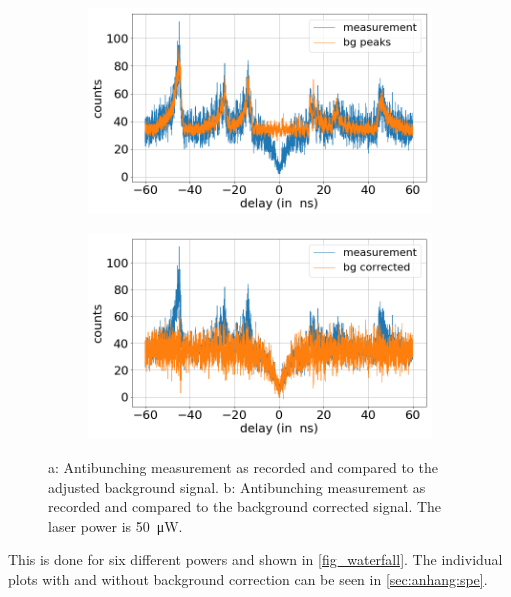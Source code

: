 \begin{figure}[H]
    \centering
    \begin{subfigure}{0.7\textwidth}
        \centering
        \includegraphics[width=1.0\textwidth]{img/output_t2/50.0muW_bg_peaks.png}
    \caption{}
    \label{fig_antibunch_background_comp}
    \end{subfigure}
    \begin{subfigure}{0.7\textwidth}
        \centering
        \includegraphics[width=\textwidth]{img/output_t2/50.0muW_bg_vgl.png}
        \caption{}
        \label{fig_antibunch_raw_corr_comp}
    \end{subfigure}
    \caption{a: Antibunching measurement as recorded and compared to the adjusted background signal. b: Antibunching measurement as recorded and compared to the background corrected signal. The laser power is \SI{50}{\micro W}.}
	\label{fig_antibunch_comp}
\end{figure}

This is done for six different powers and shown in \cref{fig_waterfall}.
The individual plots with and without background correction can be seen in \cref{sec:anhang:spe}.

